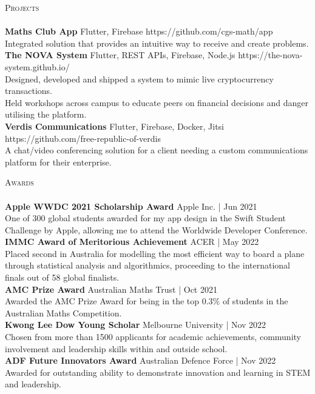 \documentclass[a4paper]{article}
\newcommand{\lineunder} {
    \vspace*{-8pt} \\
    \hspace*{-18pt} \hrulefill \\
}
\newcommand{\header} [1] {
    {\hspace*{-18pt}\vspace*{6pt} \textsc{#1}}
    \vspace*{-6pt} \lineunder
}
\begin{document}
\header{Projects}
{\textbf{Maths Club App}} {\textsl{\hfill} Flutter, Firebase}  https://github.com/cgs-math/app\\
Integrated solution that provides an intuitive way to receive and create problems.\\
\vspace*{2mm}
{\textbf{The NOVA System}} {\textsl{\hfill} Flutter, REST APIs, Firebase, Node.js}  https://the-nova-system.github.io/\\
Designed, developed and shipped a system to mimic live cryptocurrency transactions.\\
Held workshops across campus to educate peers on financial decisions and danger utilising the platform.\\
\vspace*{2mm}
{\textbf{Verdis Communications}} {\textsl{\hfill} Flutter, Firebase, Docker, Jitsi}  https://github.com/free-republic-of-verdis\\
A chat/video conferencing solution for a client needing a custom communications platform for their enterprise.\\
\vspace*{2mm}

\header{Awards}
\textbf{Apple WWDC 2021 Scholarship Award} \hfill Apple Inc. | Jun 2021\\
One of 300 global students awarded for my app design in the Swift Student Challenge by Apple, allowing me to attend the Worldwide Developer Conference.\\
\vspace*{2mm}
\textbf{IMMC Award of Meritorious Achievement} \hfill ACER | May 2022\\
Placed second in Australia for modelling the most efficient way to board a plane through statistical analysis and algorithmics, proceeding to the international finals out of 58 global finalists.\\
\vspace*{2mm}
\textbf{AMC Prize Award} \hfill Australian Maths Trust | Oct 2021\\
Awarded the AMC Prize Award for being in the top 0.3\% of students in the Australian Maths Competition.\\
\vspace*{2mm}
\textbf{Kwong Lee Dow Young Scholar} \hfill Melbourne University | Nov 2022\\
Chosen from more than 1500 applicants for academic achievements, community involvement and leadership skills within and outside school.\\
\vspace*{2mm}
\textbf{ADF Future Innovators Award} \hfill Australian Defence Force | Nov 2022\\
Awarded for outstanding ability to demonstrate innovation and learning in STEM and leadership.\\
\vspace*{2mm}
\end{document}
